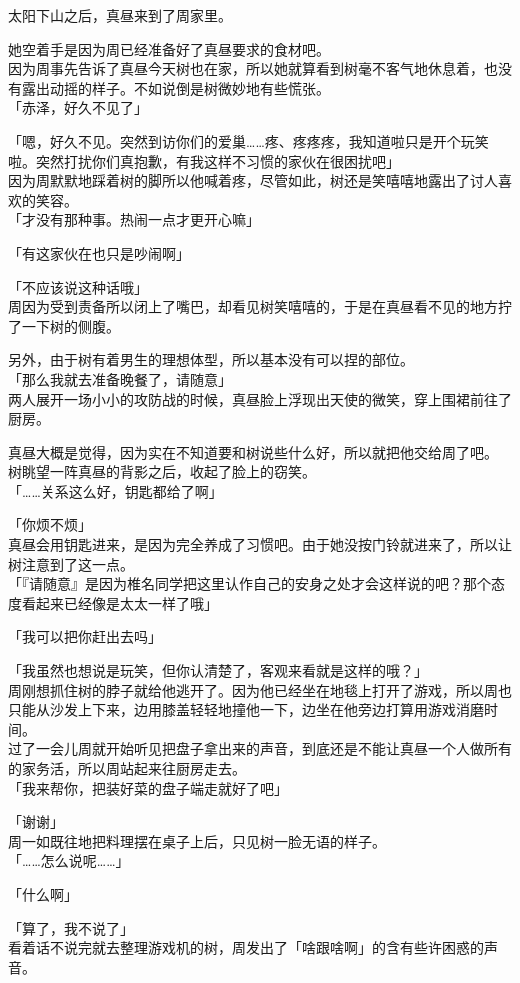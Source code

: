 \vspace{2\baselineskip}

太阳下山之后，真昼来到了周家里。

她空着手是因为周已经准备好了真昼要求的食材吧。\\

因为周事先告诉了真昼今天树也在家，所以她就算看到树毫不客气地休息着，也没有露出动摇的样子。不如说倒是树微妙地有些慌张。\\

「赤泽，好久不见了」

「嗯，好久不见。突然到访你们的爱巢……疼、疼疼疼，我知道啦只是开个玩笑啦。突然打扰你们真抱歉，有我这样不习惯的家伙在很困扰吧」\\

因为周默默地踩着树的脚所以他喊着疼，尽管如此，树还是笑嘻嘻地露出了讨人喜欢的笑容。\\

「才没有那种事。热闹一点才更开心嘛」

「有这家伙在也只是吵闹啊」

「不应该说这种话哦」\\

周因为受到责备所以闭上了嘴巴，却看见树笑嘻嘻的，于是在真昼看不见的地方拧了一下树的侧腹。

另外，由于树有着男生的理想体型，所以基本没有可以捏的部位。\\

「那么我就去准备晚餐了，请随意」\\

两人展开一场小小的攻防战的时候，真昼脸上浮现出天使的微笑，穿上围裙前往了厨房。

真昼大概是觉得，因为实在不知道要和树说些什么好，所以就把他交给周了吧。\\

树眺望一阵真昼的背影之后，收起了脸上的窃笑。\\

「……关系这么好，钥匙都给了啊」

「你烦不烦」\\

真昼会用钥匙进来，是因为完全养成了习惯吧。由于她没按门铃就进来了，所以让树注意到了这一点。\\

「『请随意』是因为椎名同学把这里认作自己的安身之处才会这样说的吧？那个态度看起来已经像是太太一样了哦」

「我可以把你赶出去吗」

「我虽然也想说是玩笑，但你认清楚了，客观来看就是这样的哦？」\\

周刚想抓住树的脖子就给他逃开了。因为他已经坐在地毯上打开了游戏，所以周也只能从沙发上下来，边用膝盖轻轻地撞他一下，边坐在他旁边打算用游戏消磨时间。\\

过了一会儿周就开始听见把盘子拿出来的声音，到底还是不能让真昼一个人做所有的家务活，所以周站起来往厨房走去。\\

「我来帮你，把装好菜的盘子端走就好了吧」

「谢谢」\\

周一如既往地把料理摆在桌子上后，只见树一脸无语的样子。\\

「……怎么说呢……」

「什么啊」

「算了，我不说了」\\

看着话不说完就去整理游戏机的树，周发出了「啥跟啥啊」的含有些许困惑的声音。
